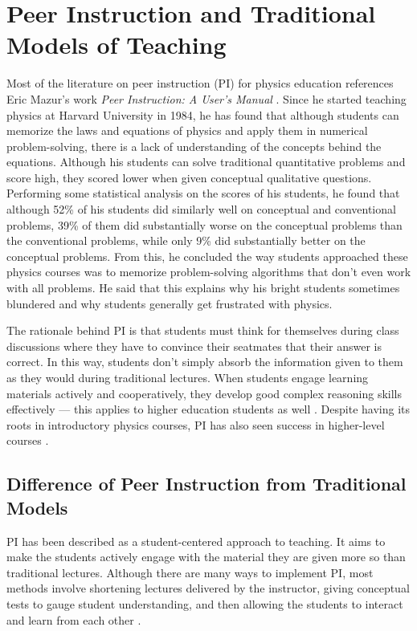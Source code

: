 \chapter{Peer Instruction and Traditional Models of Teaching}

Most of the literature on peer instruction (PI) for physics education references Eric Mazur's work \textit{Peer Instruction: A User's Manual} \cite{mazur1997peer,mazur1999}.
Since he started teaching physics at Harvard University in 1984, he has found that although students can memorize the laws and equations of physics and apply them in numerical problem-solving, there is a lack of understanding of the concepts behind the equations.
Although his students can solve traditional quantitative problems and score high, they scored lower when given conceptual qualitative questions.
Performing some statistical analysis on the scores of his students, he found that although 52\% of his students did similarly well on conceptual and conventional problems, 39\% of them did substantially worse on the conceptual problems than the conventional problems, while only 9\% did substantially better on the conceptual problems.
From this, he concluded the way students approached these physics courses was to memorize problem-solving algorithms that don't even work with all problems.
He said that this explains why his bright students sometimes blundered and why students generally get frustrated with physics.

The rationale behind PI is that students must think for themselves during class discussions where they have to convince their seatmates that their answer is correct.
In this way, students don't simply absorb the information given to them as they would during traditional lectures.
When students engage learning materials actively and cooperatively, they develop good complex reasoning skills effectively --- this applies to higher education students as well \cite{johnson2008active}.
Despite having its roots in introductory physics courses, PI has also seen success in higher-level courses \cite{fagen2000factors, fagen2002peer}.


\section{Difference of Peer Instruction from Traditional Models}\label{sec:PI vs TI}
PI has been described as a student-centered approach to teaching. 
It aims to make the students actively engage with the material they are given more so than traditional lectures.
Although there are many ways to implement PI, most methods involve shortening lectures delivered by the instructor, giving conceptual tests to gauge student understanding, and then allowing the students to interact and learn from each other \cite{crouch2001peer,mazur1999}.

